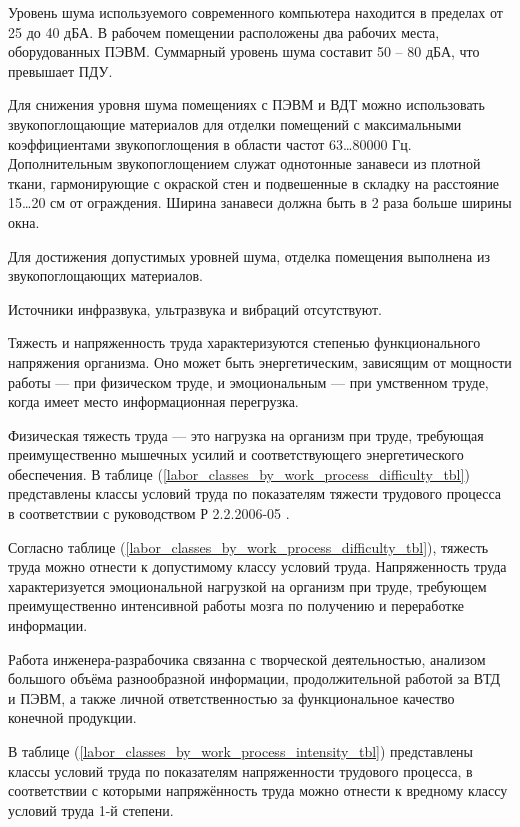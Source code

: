 Уровень шума используемого современного компьютера находится в пределах от 25 до
40 дБА. В рабочем помещении расположены два рабочих места, оборудованных ПЭВМ.
Суммарный уровень шума составит 50 – 80 дБА, что превышает ПДУ.

Для снижения уровня шума помещениях с ПЭВМ и ВДТ можно использовать звукопоглощающие
материалов для отделки помещений с максимальными коэффициентами звукопоглощения
в области частот 63…80000 Гц. Дополнительным звукопоглощением служат однотонные
занавеси из плотной ткани, гармонирующие с окраской стен и подвешенные в складку
на расстояние 15…20 см от ограждения. Ширина занавеси должна быть в 2 раза больше
ширины окна.

Для достижения допустимых уровней шума, отделка помещения выполнена из
звукопоглощающих материалов.

Источники инфразвука, ультразвука и вибраций отсутствуют.


Тяжесть и напряженность труда характеризуются степенью функционального напряжения
организма. Оно может быть энергетическим, зависящим от мощности работы — при
физическом труде, и эмоциональным — при умственном труде, когда имеет место
информационная перегрузка.

Физическая тяжесть труда — это нагрузка на организм при труде, требующая
преимущественно мышечных усилий и соответствующего энергетического обеспечения.
В таблице (\ref{labor_classes_by_work_process_difficulty_tbl}) представлены классы
условий труда по показателям тяжести трудового процесса в соответствии с
руководством Р 2.2.2006-05 \cite{ecology_man_2_2_2006_05}.




Согласно таблице (\ref{labor_classes_by_work_process_difficulty_tbl}), тяжесть
труда можно отнести к допустимому классу условий труда. Напряженность труда
характеризуется эмоциональной нагрузкой на организм при труде, требующем
преимущественно интенсивной работы мозга по получению и переработке информации.

Работа инженера-разрабочика связанна с творческой деятельностью, анализом большого
объёма разнообразной информации, продолжительной работой за ВТД и ПЭВМ, а также
личной ответственностью за функциональное качество конечной продукции.

В таблице (\ref{labor_classes_by_work_process_intensity_tbl}) представлены классы
условий труда по показателям напряженности трудового процесса, в соответствии с
которыми напряжённость труда можно отнести к вредному классу условий труда 1-й
степени.


